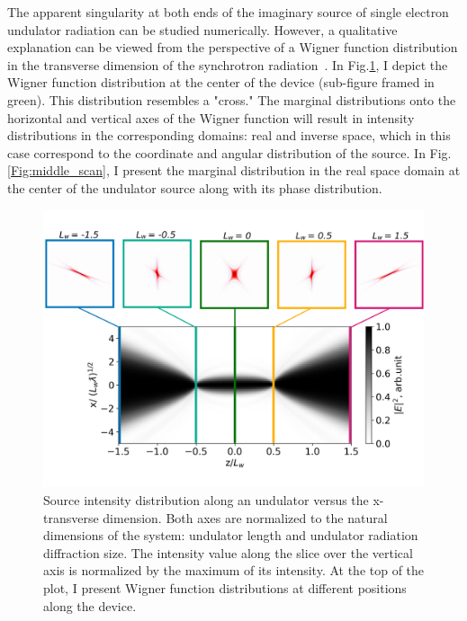     The apparent singularity at both ends of the imaginary source of single electron undulator radiation can be studied numerically. However, a qualitative explanation can be viewed from the perspective of a Wigner function distribution in the transverse dimension of the synchrotron radiation~\cite{bazarov_synchrotron_2012}. In Fig.\ref{Fig:Lw2_wig}, I depict the Wigner function distribution at the center of the device (sub-figure framed in green). This distribution resembles a "cross." The marginal distributions onto the horizontal and vertical axes of the Wigner function will result in intensity distributions in the corresponding domains: real and inverse space, which in this case correspond to the coordinate and angular distribution of the source. In Fig.\ref{Fig:middle_scan}, I present the marginal distribution in the real space domain at the center of the undulator source along with its phase distribution. 
    \begin{figure}[h!]
        \centering
        \includegraphics[width=0.9\linewidth]{content/images/Synchrotron_Radiation/Lw2_wig.pdf}
        \captionsetup{justification=centering}
        \caption{Source intensity distribution along an undulator versus the x-transverse dimension. Both axes are normalized to the natural dimensions of the system: undulator length and undulator radiation diffraction size. The intensity value along the slice over the vertical axis is normalized by the maximum of its intensity. At the top of the plot, I present Wigner function distributions at different positions along the device.}
        \label{Fig:Lw2_wig}
    \end{figure}
